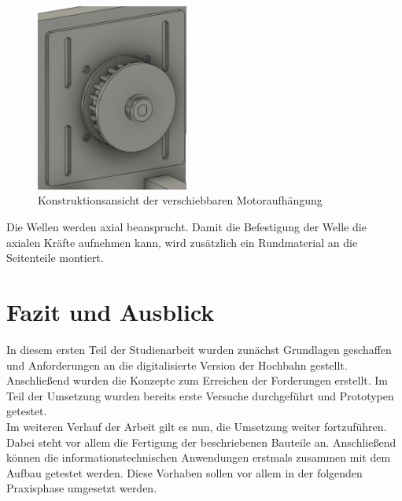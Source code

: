 \begin{figure}[h]
	\centering
	\includegraphics[width=5cm]{motoraufhaengung.png}
	\caption{Konstruktionsansicht der verschiebbaren Motoraufhängung}
	\label{pic:motoraufhaengung}
\end{figure}

Die Wellen werden axial beansprucht. Damit die Befestigung der Welle die axialen Kräfte aufnehmen kann, wird zusätzlich ein Rundmaterial an die Seitenteile montiert. 
\newpage


%
%
%
%
%
%
%
%
%	


\chapter{Fazit und Ausblick}
In diesem ersten Teil der Studienarbeit wurden zunächst Grundlagen geschaffen und Anforderungen an die digitalisierte Version der Hochbahn gestellt. Anschließend wurden die Konzepte zum Erreichen der Forderungen erstellt. Im Teil der Umsetzung wurden bereits erste Versuche durchgeführt und Prototypen getestet.\\

Im weiteren Verlauf der Arbeit gilt es nun, die Umsetzung weiter fortzuführen. Dabei steht vor allem die Fertigung der beschriebenen Bauteile an. Anschließend können die informationstechnischen Anwendungen erstmals zusammen mit dem Aufbau getestet werden. Diese Vorhaben sollen vor allem in der folgenden Praxisphase umgesetzt werden. 